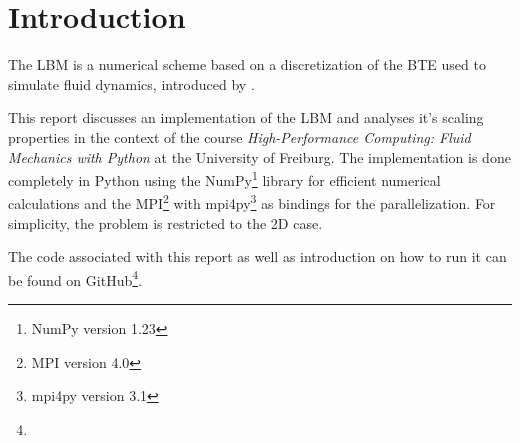 \section{Introduction}

The \gls{LBM} is a numerical scheme based on a discretization of the \gls{BTE} used to simulate fluid dynamics, introduced by \citeauthor{McNamara1988LBM} \cite{McNamara1988LBM}.

This report discusses an implementation of the \gls{LBM} and analyses it's scaling properties in the context of the course \textit{High-Performance Computing: Fluid Mechanics with Python} at the University of Freiburg. The implementation is done completely in Python using the NumPy\footnote{NumPy version 1.23} \cite{NumPy} library for efficient numerical calculations and the \gls{MPI}\footnote{MPI version 4.0} \cite{MPI40} with mpi4py\footnote{mpi4py version 3.1} \cite{mpi4py} as bindings for the parallelization. For simplicity, the problem is restricted to the 2D case.

The code associated with this report as well as introduction on how to run it can be found on GitHub\footnote{\therepository}.
